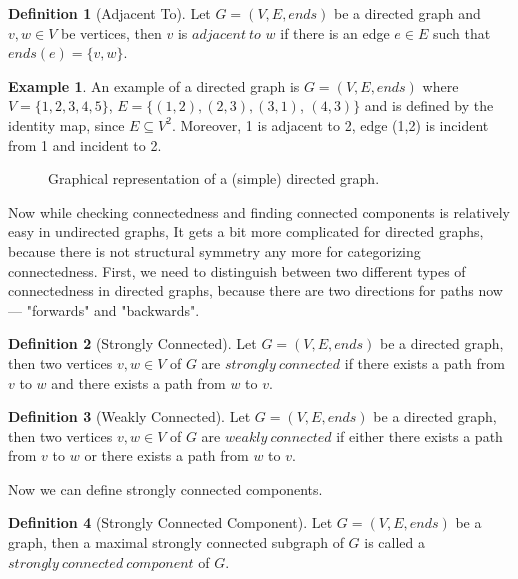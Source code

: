 \documentclass{report}
\theoremstyle{plain}
\theoremstyle{definition}
\newtheorem{definition}{Definition}
\newtheorem{example}{Example}
\theoremstyle{remark}
\numberwithin{definition}{chapter}
\numberwithin{example}{chapter}
\numberwithin{figure}{chapter}
\numberwithin{theorem}{chapter}
\numberwithin{lemma}{chapter}
\begin{document}
\begin{definition}[Adjacent To]
Let $G = (V, E, ends)$ be a directed graph and $v,w\in V$ be vertices, then $v$ is $adjacent \ to$ $w$ if there is an edge $ e \in E$ such that $ends(e) = \{v, w\}$.
\end{definition}

\begin{example}
An example of a directed graph is $G=(V, E, ends)$ where $V=\{1,2,3,4,5\}$, $E=\{(1,2), (2,3), (3,1)$, $(4,3)\}$ and is defined by the identity map, since $E \subseteq V^2$. Moreover, 1 is adjacent to 2, edge (1,2) is incident from 1 and incident to 2.

\begin{figure}[h]
\center
{}
\caption{Graphical representation of a (simple) directed graph.}
\end{figure}
\end{example}

Now while checking connectedness and finding connected components is relatively easy in undirected graphs, It gets a bit more complicated for directed graphs, because there is not structural symmetry any more for categorizing connectedness. First, we need to distinguish between two different types of connectedness in directed graphs, because there are two directions for paths now --- "forwards" and "backwards".

\begin{definition}[Strongly Connected]
Let $G = (V, E, ends)$ be a directed graph, then two vertices $v, w \in V$ of $G$ are $strongly \ connected$ if there exists a path from $v$ to $w$ and there exists a path from $w$ to $v$.
\end{definition}

\begin{definition}[Weakly Connected]
Let $G = (V, E, ends)$ be a directed graph, then two vertices $v, w \in V$ of $G$ are $weakly \ connected$ if either there exists a path from $v$ to $w$ or there exists a path from $w$ to $v$.
\end{definition}

Now we can define strongly connected components.

\begin{definition}[Strongly Connected Component]
Let $G = (V, E, ends)$ be a graph, then a maximal strongly connected subgraph of $G$ is called a $strongly \ connected \ component$ of $G$.
\end{definition}
\end{document}
